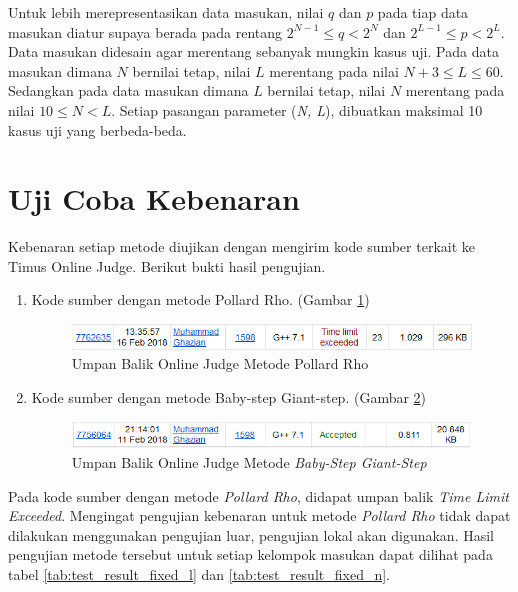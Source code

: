 Untuk lebih merepresentasikan data masukan, nilai $ q $ dan $ p $ pada tiap data masukan diatur supaya berada pada rentang $ 2^{N-1} \leq q < 2^N $ dan $ 2^{L-1} \leq p < 2^L $. Data masukan didesain agar merentang sebanyak mungkin kasus uji. Pada data masukan dimana $ N $ bernilai tetap, nilai $ L $ merentang pada nilai $ N+3 \leq L \leq 60 $. Sedangkan pada data masukan dimana $ L $ bernilai tetap, nilai $ N $ merentang pada nilai $ 10 \leq N < L $.  Setiap pasangan parameter (\textit{N, L}), dibuatkan maksimal 10 kasus uji yang berbeda-beda.

\section{Uji Coba Kebenaran}

Kebenaran setiap metode diujikan dengan mengirim kode sumber terkait ke Timus Online Judge. Berikut bukti hasil pengujian.

\begin{enumerate}
\item Kode sumber dengan metode Pollard Rho. (Gambar \ref{fig:verdict_pollard})
\begin{figure}[h!]
	\includegraphics[scale=0.6]{bab5/img/pollard-verdict}
	\caption{Umpan Balik Online Judge Metode Pollard Rho}
	\label{fig:verdict_pollard}
\end{figure}
\item Kode sumber dengan metode Baby-step Giant-step. (Gambar \ref{fig:verdict_bsgs})
\begin{figure}[h!]
	\includegraphics[scale=0.6]{bab5/img/bsgs-verdict}
	\caption{Umpan Balik Online Judge Metode \textit{Baby-Step Giant-Step}}
	\label{fig:verdict_bsgs}
\end{figure}
\end{enumerate}

Pada kode sumber dengan metode \textit{Pollard Rho}, didapat umpan balik \textit{Time Limit Exceeded}. Mengingat pengujian kebenaran untuk metode \textit{Pollard Rho} tidak dapat dilakukan menggunakan pengujian luar, pengujian lokal akan digunakan. Hasil pengujian metode tersebut untuk setiap kelompok masukan dapat dilihat pada tabel \ref{tab:test_result_fixed_l} dan \ref{tab:test_result_fixed_n}.

